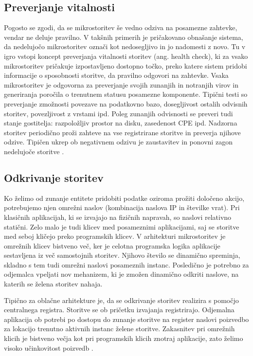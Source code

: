 \documentclass[a4paper, 12pt]{book}
\begin{document}
\subsection{Preverjanje vitalnosti}

Pogosto se zgodi, da se mikrostoritev še vedno odziva na posamezne zahtevke, vendar ne deluje pravilno.
V takšnih primerih je pričakovano obnašanje sistema, da nedelujočo mikrostoritev označi kot nedosegljivo in jo nadomesti z novo.
Tu v igro vstopi koncept preverjanja vitalnosti storitev (ang. health check), ki za vsako mikrostoritev pričakuje izpostavljeno dostopno točko, preko katere sistem pridobi informacije o sposobnosti storitve, da pravilno odgovori na zahtevke.
Vsaka mikrostoritev je odgovorna za preverjanje svojih zunanjih in notranjih virov in generiranja poročila o trenutnem statusu posamezne komponente.
Tipični testi so preverjanje zmožnosti povezave na podatkovno bazo, dosegljivost ostalih odvisnih storitev, povezljivost z vrstami ipd.
Poleg zunanjih odvisnosti se preveri tudi stanje gostitelja: razpoložljiv prostor na disku, zasedenost CPE ipd.
Nadzorna storitev periodično proži zahteve na vse registrirane storitve in preverja njihove odzive.
Tipičen ukrep ob negativnem odzivu je zaustavitev in ponovni zagon nedelujoče storitve \cite{healthCheck}.

\subsection{Odkrivanje storitev}

Ko želimo od zunanje entitete pridobiti podatke oziroma prožiti določeno akcijo, potrebujemo njen omrežni naslov (kombinacija naslova IP in številke vrat).
Pri klasičnih aplikacijah, ki se izvajajo na fizičnih napravah, so naslovi relativno statični.
Zelo malo je tudi klicev med posameznimi aplikacijami, saj se storitve med seboj kličejo preko programskih klicev.
V arhitekturi mikrostoritev je omrežnih klicev bistveno več, ker je celotna programska logika aplikacije sestavljena iz več samostojnih storitev.
Njihovo število se dinamično spreminja, skladno s tem tudi omrežni naslovi posameznih instanc.
Posledično je potrebno za odjemalca vpeljati nov mehanizem, ki je zmožen dinamično odkriti naslove, na katerih se želena storitev nahaja.

Tipično za oblačne arhitekture je, da se odkrivanje storitev realizira s pomočjo centralnega registra.
Storitve se ob pričetku izvajanja registrirajo.
Odjemalna aplikacija ob potrebi po dostopu do zunanje storitve na register naslovi poizvedbo za lokacijo trenutno aktivnih instanc želene storitve.
Zakasnitev pri omrežnih klicih je bistveno večja kot pri programskih klicih znotraj aplikacije, zato želimo visoko učinkovitost poizvedb \cite{serviceDiscovery, maldip}.
\end{document}
